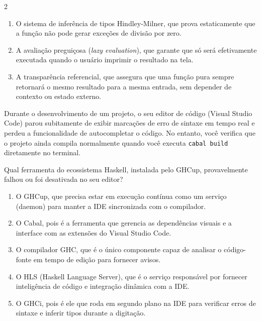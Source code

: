\documentclass[a4paper,10pt,brazil]{article}
\begin{document}
\begin{multicols}{2}
\begin{enumerate}
  \item O sistema de inferência de tipos Hindley-Milner, que prova estaticamente que a função não pode gerar exceções de divisão por zero.

  \item A avaliação preguiçosa (\emph{lazy evaluation}), que garante que  só será efetivamente executada quando o usuário imprimir o resultado na tela.

  \item A transparência referencial, que assegura que uma função pura sempre retornará o mesmo resultado para a mesma entrada, sem depender de contexto ou estado externo.


\end{enumerate}

Durante o desenvolvimento de um projeto, o seu editor de código (Visual Studio Code) parou subitamente de exibir marcações de erro de sintaxe em tempo real e perdeu a funcionalidade de autocompletar o código. No entanto, você verifica que o projeto ainda compila normalmente quando você executa \texttt{cabal build} diretamente no terminal. 

Qual ferramenta do ecossistema Haskell, instalada pelo GHCup, provavelmente falhou ou foi desativada no seu editor?

\begin{enumerate}
  \item O GHCup, que precisa estar em execução contínua como um serviço (daemon) para manter a IDE sincronizada com o compilador.

  \item O Cabal, pois é a ferramenta que gerencia as dependências visuais e a interface com as extensões do Visual Studio Code.

  \item O compilador GHC, que é o único componente capaz de analisar o código-fonte em tempo de edição para fornecer avisos.

  \item O HLS (Haskell Language Server), que é o serviço responsável por fornecer inteligência de código e integração dinâmica com a IDE.

  \item O GHCi, pois é ele que roda em segundo plano na IDE para verificar erros de sintaxe e inferir tipos durante a digitação.


\end{enumerate}


\end{multicols}
\end{document}
